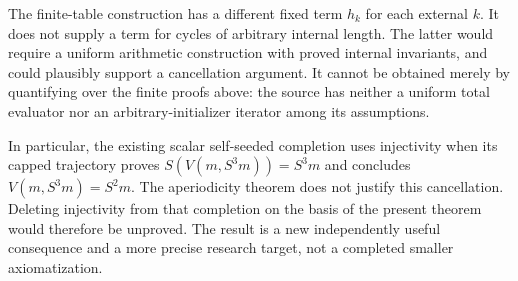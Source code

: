The finite-table construction has a different fixed term $h_k$ for each
external $k$. It does not supply a term for cycles of arbitrary internal
length. The latter would require a uniform arithmetic construction with
proved internal invariants, and could plausibly support a cancellation
argument. It cannot be obtained merely by quantifying over the finite
proofs above: the source has neither a uniform total evaluator nor an
arbitrary-initializer iterator among its assumptions.

In particular, the existing scalar self-seeded completion uses injectivity
when its capped trajectory proves
$S(V(m,S^3m))=S^3m$ and concludes $V(m,S^3m)=S^2m$. The aperiodicity
theorem does not justify this cancellation. Deleting injectivity from that
completion on the basis of the present theorem would therefore be
unproved. The result is a new independently useful consequence and a
more precise research target, not a completed smaller axiomatization.
